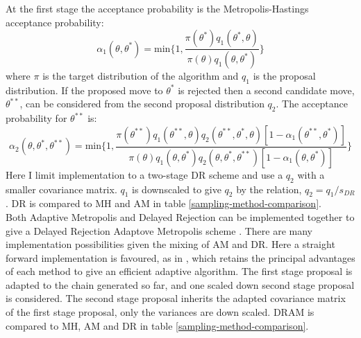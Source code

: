 At the first stage the acceptance probability is the Metropolis-Hastings acceptance probability:
\begin{equation}
	\alpha_1(\theta,\theta^*) = \text{min}\bigg\{1,\frac{\pi(\theta^*)q_1(\theta^*,\theta)}{\pi(\theta)q_1(\theta,\theta^*)} \bigg\}
\end{equation}
where $\pi$ is the target distribution of the algorithm and $q_1$ is the proposal distribution. If the proposed move to $\theta^*$ is rejected then a second candidate move, $\theta^{**}$, can be considered from the second proposal distribution $q_2$. The acceptance probability for $\theta^{**}$ is:
\begin{equation}
	\alpha_2(\theta,\theta^*,\theta^{**}) = \text{min}\bigg\{1,\frac{\pi(\theta^{**})q_1(\theta^{**},\theta)q_2(\theta^{**},\theta^*,\theta)[1-\alpha_1(\theta^{**},\theta^*)]}{\pi(\theta)q_1(\theta,\theta^*)q_2(\theta,\theta^*,\theta^{**})[1-\alpha_1(\theta,\theta^*)]} \bigg\}
\end{equation}
Here I limit implementation to a two-stage DR scheme and use a $q_2$ with a smaller covariance matrix. $q_1$ is downscaled to give $q_2$ by the relation, $q_2 = q_1/s_{DR}$. DR is compared to MH and AM in table \ref{sampling-method-comparison}.\\

Both Adaptive Metropolis and Delayed Rejection can be implemented together to give a Delayed Rejection Adaptove Metropolis scheme \citep{Laine2008}. There are many implementation possibilities given the mixing of AM and DR. Here a straight forward implementation is favoured, as in \citet{Laine2008}, which retains the principal advantages of each method to give an efficient adaptive algorithm.    The first stage proposal is adapted to the chain generated so far, and one scaled down second stage proposal is considered. The second stage proposal inherits the adapted covariance matrix of the first stage proposal, only the variances are down scaled. DRAM is compared to MH, AM and DR in table \ref{sampling-method-comparison}.\\

